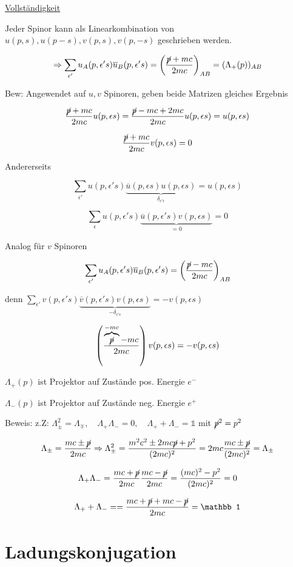 \underline{Vollständigkeit}

Jeder Spinor kann als Linearkombination von \(u(p,s), u(p-s), v(p,s), v(p,-s)\) geschrieben werden.

\[\Rightarrow \sum_{\epsilon'} u_{A}(p,\epsilon's )\overline u_B(p,\epsilon' s) = \left(\frac{\cancel p +mc}{2mc}\right)_{AB} = (\Lambda_+(p))_{AB}\]

Bew: Angewendet auf \(u,v\) Spinoren, geben beide Matrizen gleiches Ergebnis

\[\frac{\cancel p + mc}{2mc} u(p,\epsilon s) =\frac{\cancel p -mc+2mc}{2mc} u(p,\epsilon s) = u(p,\epsilon s) \]


\[\frac{\cancel p + mc}{2mc} v(p,\epsilon s) = 0 \]


Andererseits

\[\sum_{\epsilon'} u(p,\epsilon' s)\underbrace{\overline u(p,\epsilon s) u(p,\epsilon s)}_{\delta_{\epsilon'\epsilon}} = u(p,\epsilon s)\]

\[\sum_{\epsilon} u(p,\epsilon' s)\underbrace{\overline u(p,\epsilon' s) v(p,\epsilon s)}_{=0} = 0\]


Analog für \(v\) Spinoren

\[ \sum_{\epsilon'} u_A(p,\epsilon' s) \overline u_B(p,\epsilon' s) = \left(\frac{\cancel p -mc}{2mc}\right)_{AB}\]


denn \(\sum_{\epsilon'} v(p,\epsilon' s)\underbrace{\overline v (p,\epsilon' s) v(p,\epsilon s)}_{-\delta_{\epsilon'\epsilon}} = -v(p,\epsilon s)\)

\[ \left(\frac{\overbrace{\cancel p}^{-mc} -mc}{2mc}\right) v(p,\epsilon s) = -v(p,\epsilon s) \]


\(\Lambda_+(p)\) ist Projektor auf Zustände pos. Energie \(e^-\)

\(\Lambda_-(p)\) ist Projektor auf Zustände neg. Energie \(e^+\)

Beweis: z.Z: \(\Lambda^2_{\pm}=\Lambda_\mp,\quad \Lambda_+\Lambda_- = 0,\quad \Lambda_++\Lambda_- = \mathbb 1\) mit \(\cancel p^2 = p^2\)

\[ \Lambda_{\pm} = \frac{mc\pm \cancel p}{2mc} \Rightarrow \Lambda^2_{\pm} = \frac{m^2c^2\pm 2mc\cancel p+p^2}{(2mc)^2} = 2mc \frac{mc\pm \cancel p}{(2mc)^2} = \Lambda_\pm\]


\[ \Lambda_+\Lambda_- = \frac{mc+\cancel p}{2mc}\frac{mc-\cancel p}{2mc} = \frac{(mc)^2-p^2}{(2mc)^2} = 0 \]

\[ \Lambda_++\Lambda_- = = \frac{mc+\cancel p + mc - \cancel p}{2mc} = \mathbb 1 \]


\section{Ladungskonjugation}

